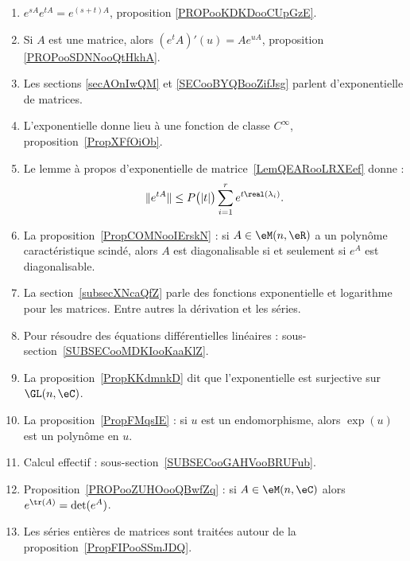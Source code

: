 \begin{description}
	      \begin{enumerate}
		      \item
		            \( e^{sA} e^{tA}= e^{(s+t)A}\), proposition \ref{PROPooKDKDooCUpGzE}.
		      \item
		            Si \( A\) est une matrice, alors \( (e^tA)'(u)=Ae^{uA}\), proposition \ref{PROPooSDNNooQtHkhA}.
		      \item
		            Les sections \ref{secAOnIwQM} et \ref{SECooBYQBooZifJsg} parlent d'exponentielle de matrices.
		      \item
		            L'exponentielle donne lieu à une fonction de classe \(  C^{\infty}\), proposition~\ref{PropXFfOiOb}.
		      \item
		            Le lemme à propos d'exponentielle de matrice~\ref{LemQEARooLRXEef} donne :
		            \begin{equation*}
			            \|  e^{tA} \|\leq P\big( | t | \big)\sum_{i=1}^r e^{t\real(\lambda_i)}.
		            \end{equation*}
		      \item
		            La proposition~\ref{PropCOMNooIErskN} : si \( A\in \eM(n,\eR)\) a un polynôme caractéristique scindé, alors \( A\) est diagonalisable si et seulement si \( e^A\) est diagonalisable.
		      \item
		            La section~\ref{subsecXNcaQfZ} parle des fonctions exponentielle et logarithme pour les matrices. Entre autres la dérivation et les séries.
		      \item
		            Pour résoudre des équations différentielles linéaires : sous-section~\ref{SUBSECooMDKIooKaaKlZ}.
		      \item
		            La proposition~\ref{PropKKdmnkD} dit que l'exponentielle est surjective sur \( \GL(n,\eC)\).
		      \item

		            La proposition~\ref{PropFMqsIE} : si \( u\) est un endomorphisme, alors \( \exp(u)\) est un polynôme en \( u\).
		      \item
		            Calcul effectif : sous-section~\ref{SUBSECooGAHVooBRUFub}.
		      \item Proposition~\ref{PROPooZUHOooQBwfZq} : si \( A\in\eM(n,\eC)\) alors \( e^{\tr(A)}=\det( e^{A})\).
		      \item
		            Les séries entières de matrices sont traitées autour de la proposition~\ref{PropFIPooSSmJDQ}.
	      \end{enumerate}


\end{description}

